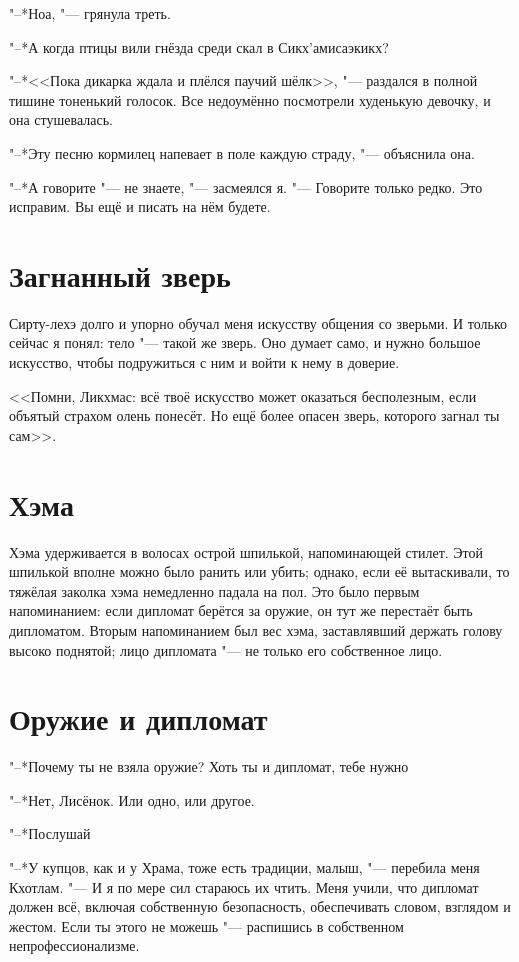 \documentclass[a4paper,10pt]{book}
\newcommand{\ldotst}{\so{...}\xspace}
\begin{document}
"--*Ноа, "--- грянула треть.

"--*А когда птицы вили гнёзда среди скал в Сикх'амисаэкикх?

"--*<<Пока дикарка ждала и плёлся паучий шёлк>>, "--- раздался в полной тишине 
тоненький голосок.
Все недоумённо посмотрели худенькую девочку, и она стушевалась.

"--*Эту песню кормилец напевает в поле каждую страду, "--- объяснила она.

"--*А говорите "--- не знаете, "--- засмеялся я. "--- Говорите только редко.
Это исправим. Вы ещё и писать на нём будете.

 \section{Загнанный зверь}

Сирту-лехэ долго и упорно обучал меня искусству общения со зверьми. И только 
сейчас я понял: 
тело "--- такой же зверь. Оно думает само, и нужно большое искусство, чтобы 
подружиться с ним и войти к нему в доверие.

<<Помни, Ликхмас: всё твоё искусство может оказаться бесполезным, если объятый 
страхом олень понесёт.
Но ещё более опасен зверь, которого загнал ты сам>>.

\section{Хэма}

Хэма удерживается в волосах острой шпилькой, напоминающей стилет. Этой шпилькой 
вполне можно было ранить или убить;
однако, если её вытаскивали, то тяжёлая заколка хэма немедленно падала на пол. 
Это было первым напоминанием: если дипломат берётся за оружие,
он тут же перестаёт быть дипломатом. Вторым напоминанием был вес хэма, 
заставлявший держать голову высоко поднятой; лицо дипломата "---
не только его собственное лицо.

\section{Оружие и дипломат}

"--*Почему ты не взяла оружие? Хоть ты и дипломат, тебе нужно\ldotst

"--*Нет, Лисёнок. Или одно, или другое.

"--*Послушай\ldotst

"--*У купцов, как и у Храма, тоже есть традиции, малыш, "--- перебила меня 
Кхотлам.
"--- И я по мере сил стараюсь их чтить. Меня учили, что дипломат должен всё,
включая собственную безопасность, обеспечивать словом, взглядом и жестом.
Если ты этого не можешь "--- распишись в собственном непрофессионализме.
\end{document}
